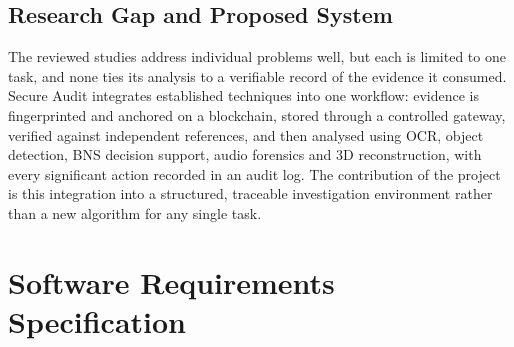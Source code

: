 \documentclass[12pt,a4paper,oneside]{report}
\begin{document}
\section{Research Gap and Proposed System}
The reviewed studies address individual problems well, but each is limited to one task, and none ties its analysis to a verifiable record of the evidence it consumed. Secure Audit integrates established techniques into one workflow: evidence is fingerprinted and anchored on a blockchain, stored through a controlled gateway, verified against independent references, and then analysed using OCR, object detection, BNS decision support, audio forensics and 3D reconstruction, with every significant action recorded in an audit log. The contribution of the project is this integration into a structured, traceable investigation environment rather than a new algorithm for any single task.

\chapter{Software Requirements Specification}
\end{document}
